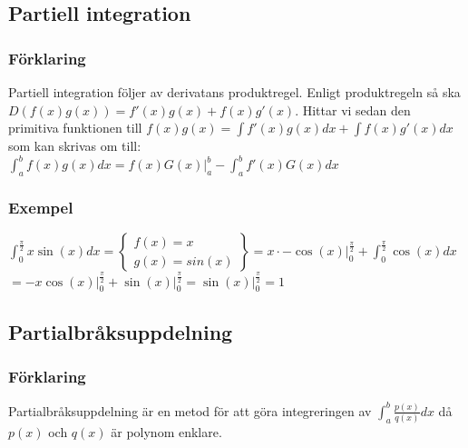 \documentclass{article}
\begin{document}
\subsection{Partiell integration}
\subsubsection{Förklaring}
Partiell integration följer av derivatans produktregel. Enligt produktregeln så ska $D(f(x)g(x))=f'(x)g(x)+f(x)g'(x)$. Hittar vi sedan den primitiva funktionen till ${\displaystyle f(x)g(x)=\int f'(x)g(x)dx + \int f(x)g'(x)dx}$ som kan skrivas om till:\\
${\displaystyle\int_{a}^{b}f(x)g(x)dx=f(x)G(x)\bigg\vert_{a}^{b} - \int_{a}^{b}f'(x)G(x)dx}$

\subsubsection{Exempel}
${\displaystyle \int_{0}^{\frac{\pi}{2}}x\sin(x)dx=\left\{\begin{array}{l}
   f(x)=x   \\
   g(x)=sin(x)
\end{array}
\right\} = x \cdot-\cos(x)\bigg\vert_{0}^{\frac{\pi}{2}} + \int_{0}^{\frac{\pi}{2}}\cos(x)dx}$ \\
$= -x\cos(x)\bigg\vert_{0}^{\frac{\pi}{2}} + \sin(x)\bigg\vert_{0}^{\frac{\pi}{2}} = \sin(x)\bigg\vert_{0}^{\frac{\pi}{2}}=1$

\subsection{Partialbråksuppdelning}
\subsubsection{Förklaring}
Partialbråksuppdelning är en metod för att göra integreringen av ${\displaystyle\int_{a}^{b}\frac{p(x)}{q(x)}dx }$ då $p(x)$ och $q(x)$ är polynom enklare.
\end{document}
